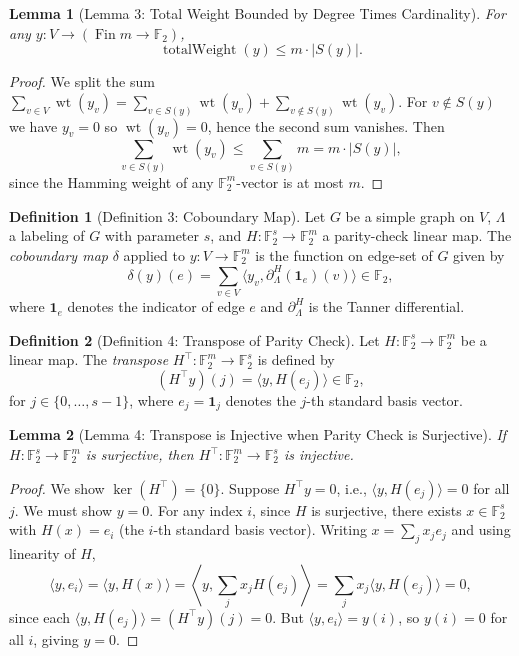 \documentclass[11pt]{article}
\theoremstyle{plain}
\newtheorem*{lemma}{Lemma}
\theoremstyle{definition}
\newtheorem*{definition}{Definition}
\theoremstyle{remark}
\renewcommand{\ker}{\operatorname{ker}}
\begin{document}
\begin{lemma}[Lemma 3: Total Weight Bounded by Degree Times Cardinality]
For any $y : V \to (\operatorname{Fin} m \to \mathbb{F}_2)$,
\[
\operatorname{totalWeight}(y) \leq m \cdot |S(y)|.
\]
\end{lemma}

\begin{proof}
We split the sum $\sum_{v \in V} \operatorname{wt}(y_v) = \sum_{v \in S(y)} \operatorname{wt}(y_v) + \sum_{v \notin S(y)} \operatorname{wt}(y_v)$. For $v \notin S(y)$ we have $y_v = 0$ so $\operatorname{wt}(y_v) = 0$, hence the second sum vanishes. Then
\[
\sum_{v \in S(y)} \operatorname{wt}(y_v) \leq \sum_{v \in S(y)} m = m \cdot |S(y)|,
\]
since the Hamming weight of any $\mathbb{F}_2^m$-vector is at most $m$.
\end{proof}

\begin{definition}[Definition 3: Coboundary Map]
Let $G$ be a simple graph on $V$, $\Lambda$ a labeling of $G$ with parameter $s$, and $H : \mathbb{F}_2^s \to \mathbb{F}_2^m$ a parity-check linear map. The \emph{coboundary map} $\delta$ applied to $y : V \to \mathbb{F}_2^m$ is the function on edge-set of $G$ given by
\[
\delta(y)(e) = \sum_{v \in V} \langle y_v, \partial_\Lambda^H(\mathbf{1}_e)(v) \rangle \in \mathbb{F}_2,
\]
where $\mathbf{1}_e$ denotes the indicator of edge $e$ and $\partial_\Lambda^H$ is the Tanner differential.
\end{definition}

\begin{definition}[Definition 4: Transpose of Parity Check]
Let $H : \mathbb{F}_2^s \to \mathbb{F}_2^m$ be a linear map. The \emph{transpose} $H^\top : \mathbb{F}_2^m \to \mathbb{F}_2^s$ is defined by
\[
(H^\top y)(j) = \langle y, H(e_j) \rangle \in \mathbb{F}_2,
\]
for $j \in \{0,\ldots,s-1\}$, where $e_j = \mathbf{1}_j$ denotes the $j$-th standard basis vector.
\end{definition}

\begin{lemma}[Lemma 4: Transpose is Injective when Parity Check is Surjective]
If $H : \mathbb{F}_2^s \to \mathbb{F}_2^m$ is surjective, then $H^\top : \mathbb{F}_2^m \to \mathbb{F}_2^s$ is injective.
\end{lemma}

\begin{proof}
We show $\ker(H^\top) = \{0\}$. Suppose $H^\top y = 0$, i.e., $\langle y, H(e_j) \rangle = 0$ for all $j$. We must show $y = 0$. For any index $i$, since $H$ is surjective, there exists $x \in \mathbb{F}_2^s$ with $H(x) = e_i$ (the $i$-th standard basis vector). Writing $x = \sum_j x_j e_j$ and using linearity of $H$,
\[
\langle y, e_i \rangle = \langle y, H(x) \rangle = \left\langle y, \sum_j x_j H(e_j) \right\rangle = \sum_j x_j \langle y, H(e_j) \rangle = 0,
\]
since each $\langle y, H(e_j) \rangle = (H^\top y)(j) = 0$. But $\langle y, e_i \rangle = y(i)$, so $y(i) = 0$ for all $i$, giving $y = 0$.
\end{proof}
\end{document}
